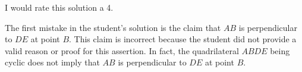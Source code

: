 I would rate this solution a 4.

The first mistake in the student's solution is the claim that \( AB \) is perpendicular to \( DE \) at point \( B \). This claim is incorrect because the student did not provide a valid reason or proof for this assertion. In fact, the quadrilateral \( ABDE \) being cyclic does not imply that \( AB \) is perpendicular to \( DE \) at point \( B \).
